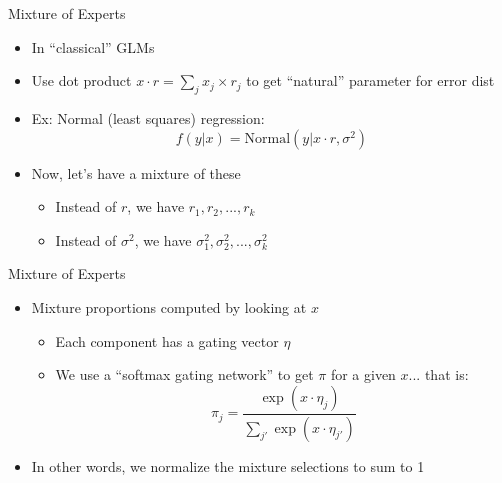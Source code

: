 \documentclass[aspectratio=169]{beamer}
\begin{document}
\begin{frame}{Mixture of Experts}

\begin{itemize}
	\item In ``classical'' GLMs
	\item Use dot product $x \cdot r = \sum_j x_j \times r_j$ to get ``natural'' parameter for error dist
	\item Ex: Normal (least squares) regression:
	$$f (y | x) = \textrm{Normal} (y | x \cdot r, \sigma^2)$$
\item Now, let's have a mixture of these
\begin{itemize}
	\item Instead of $r$, we have $r_1, r_2, ..., r_k$
	\item Instead of $\sigma^2$, we have $\sigma^2_1, \sigma^2_2, ..., \sigma^2_k$
\end{itemize}
\end{itemize}
\end{frame}

\begin{frame}{Mixture of Experts}

\begin{itemize}
\item Mixture proportions computed by looking at $x$
	\begin{itemize}
	\item Each component has a gating vector $\eta$
\item We use a ``softmax gating network'' to get $\pi$ for a given $x$... that is:
	$$\pi_j = \frac{\exp (x \cdot \eta_j)}{\sum_{j'} \exp (x \cdot \eta_{j'})}$$
	\end{itemize}
\item In other words, we normalize the mixture selections to sum to 1
\end{itemize}
\end{frame}

%
%
%


%
%
\end{document}

